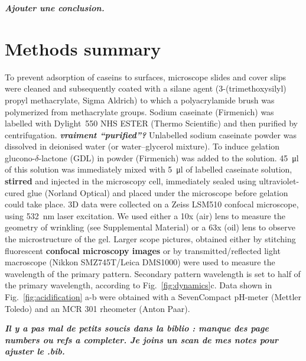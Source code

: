 \documentclass[twocolumn,superscriptaddress,showpacs,preprintnumbers,
amsmath,amssymb,prl]{revtex4-1}
\newcommand{\seb}[1]{\textbf{\color{blue}#1}} %
\begin{document}
\seb{\it Ajouter une conclusion.}

\section*{Methods summary}
To prevent adsorption of caseins to surfaces, microscope slides and cover slips were cleaned and subsequently coated with a silane agent (3-(trimethoxysilyl) propyl methacrylate, Sigma Aldrich) to which a polyacrylamide brush was polymerized from methacrylate groups.
Sodium caseinate (Firmenich) was labelled with Dylight~550 NHS ESTER (Thermo Scientific) and then purified by centrifugation. \seb{\it vraiment ``purified''?} Unlabelled sodium caseinate powder was dissolved in deionised water (or water--glycerol mixture). To induce gelation glucono-$\delta$-lactone (GDL) in powder (Firmenich) was added to the solution. \SI{45}{\micro\litre} of this solution was immediately mixed with \SI{5}{\micro\litre} of labelled caseinate solution, \seb{stirred} and injected in the microscopy cell, immediately sealed using ultraviolet-cured glue (Norland Optical) and placed under the microscope before gelation could take place. 
3D data were collected on a Zeiss LSM510 confocal microscope, using \SI{532}{\nano\meter} laser excitation. We used either a 10x (air) lens to measure the geometry of wrinkling (see Supplemental Material) or a 63x (oil) lens to observe the microstructure of the gel. Larger scope pictures, obtained either by stitching fluorescent \seb{confocal microscopy images} or by transmitted/reflected light macroscope (Nikkon SMZ745T/Leica DMS1000) were used to measure the wavelength of the primary pattern. Secondary pattern wavelength is set to half of the primary wavelength, according to Fig.~\ref{fig:dynamics}c.
Data shown in Fig.~\ref{fig:acidification} a-b were obtained with a SevenCompact pH-meter (Mettler Toledo) and an MCR 301 rheometer (Anton Paar).

\seb{\it Il y a pas mal de petits soucis dans la biblio : manque des page numbers ou refs a completer. Je joins un scan de mes notes pour ajuster le .bib.}



\end{document}
